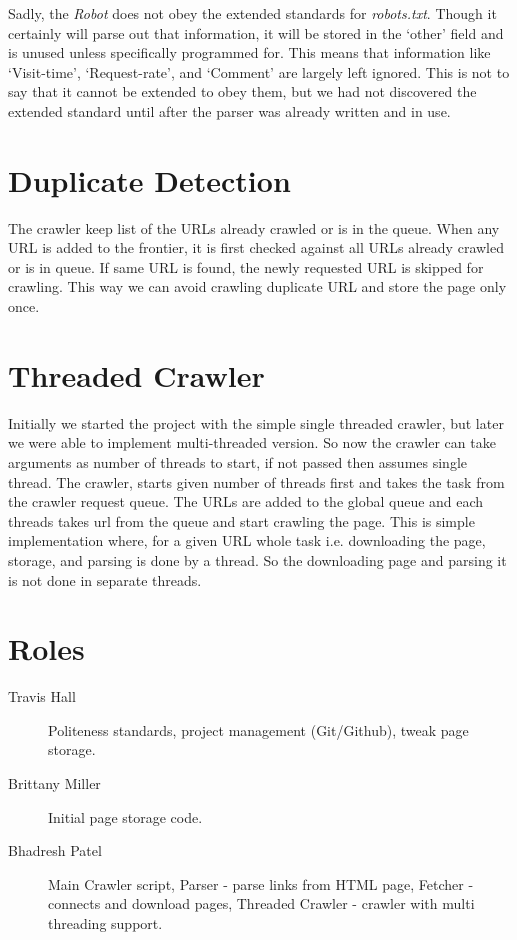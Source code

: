 \documentclass[letterpaper,11pt,twoside]{article}
\begin{document}
Sadly, the \emph{Robot} does not obey the extended standards for \emph{robots.txt}. Though it certainly will parse out that information, it will be stored in the `other' field and is unused unless specifically programmed for. This means that information like `Visit-time', `Request-rate', and `Comment' are largely left ignored. This is not to say that it cannot be extended to obey them, but we had not discovered the extended standard until after the parser was already written and in use.

\section{Duplicate Detection}
The crawler keep list of the URLs already crawled or is in the queue. When any URL is added to the frontier, it is first checked against all URLs already crawled or is in queue. If same URL is found, the newly requested URL is skipped for crawling. This way we can avoid crawling duplicate URL and store the page only once.

\section{Threaded Crawler}
Initially we started the project with the simple single threaded crawler, but later we were able to implement multi-threaded version. So now the crawler can take arguments as number of threads to start, if not passed then assumes single thread. The crawler, starts given number of threads first and takes the task from the crawler request queue. The URLs are added to the global queue and each threads takes url from the queue and start crawling the page. This is simple implementation where, for a given URL whole task i.e. downloading the page, storage, and parsing is done by a thread. So the downloading page and parsing it is not done in separate threads. 

\section{Roles}

\begin{description}
 \item[Travis Hall] Politeness standards, project management (Git/Github), tweak page storage.
 \item[Brittany Miller] Initial page storage code.
 \item[Bhadresh Patel] Main Crawler script, Parser - parse links from HTML page, Fetcher - connects and download pages, Threaded Crawler - crawler with multi threading support.
\end{description}
\end{document}
